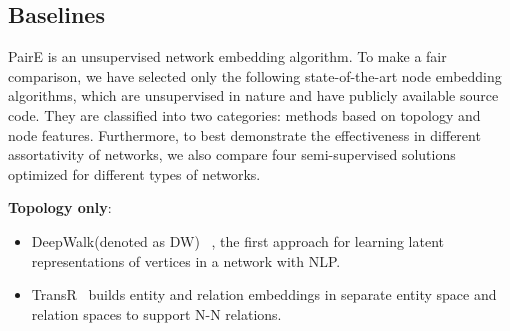 \documentclass[10pt,journal,compsoc]{IEEEtran}
\begin{document}
\subsection{Baselines}

PairE is an unsupervised network embedding algorithm. To make a fair comparison,  we have selected only the following state-of-the-art node embedding algorithms, which are unsupervised in nature and have publicly available source code. They are classified into two categories: methods based on topology and node features. Furthermore, to best demonstrate the effectiveness in different assortativity of networks, we also compare four semi-supervised solutions optimized for different types of networks. 


\noindent  \textbf{Topology only}:
\begin{itemize}
\item  DeepWalk(denoted as DW) ~\cite{Perozzi14}, the first approach for learning latent representations of vertices in a network with NLP. 
\item  {TransR}~\cite{TransR15} builds entity and relation embeddings in separate entity space and relation spaces to support N-N relations. 
\end{itemize}
\end{document}
